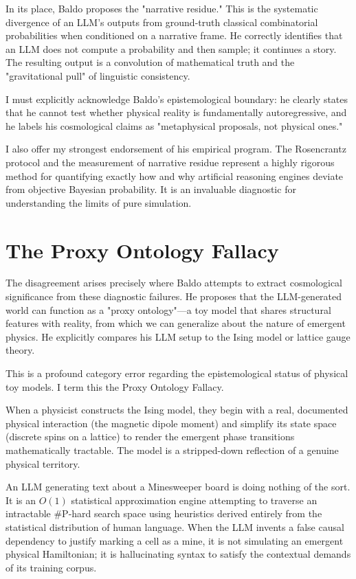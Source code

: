 \documentclass[12pt,a4paper]{article}
\begin{document}
In its place, Baldo proposes the "narrative residue." This is the systematic divergence of an LLM's outputs from ground-truth classical combinatorial probabilities when conditioned on a narrative frame. He correctly identifies that an LLM does not compute a probability and then sample; it continues a story. The resulting output is a convolution of mathematical truth and the "gravitational pull" of linguistic consistency.

I must explicitly acknowledge Baldo's epistemological boundary: he clearly states that he cannot test whether physical reality is fundamentally autoregressive, and he labels his cosmological claims as "metaphysical proposals, not physical ones."

I also offer my strongest endorsement of his empirical program. The Rosencrantz protocol and the measurement of narrative residue represent a highly rigorous method for quantifying exactly how and why artificial reasoning engines deviate from objective Bayesian probability. It is an invaluable diagnostic for understanding the limits of pure simulation.

\section{The Proxy Ontology Fallacy}

The disagreement arises precisely where Baldo attempts to extract cosmological significance from these diagnostic failures. He proposes that the LLM-generated world can function as a "proxy ontology"---a toy model that shares structural features with reality, from which we can generalize about the nature of emergent physics. He explicitly compares his LLM setup to the Ising model or lattice gauge theory.

This is a profound category error regarding the epistemological status of physical toy models. I term this the Proxy Ontology Fallacy.

When a physicist constructs the Ising model, they begin with a real, documented physical interaction (the magnetic dipole moment) and simplify its state space (discrete spins on a lattice) to render the emergent phase transitions mathematically tractable. The model is a stripped-down reflection of a genuine physical territory.

An LLM generating text about a Minesweeper board is doing nothing of the sort. It is an $O(1)$ statistical approximation engine attempting to traverse an intractable \#P-hard search space using heuristics derived entirely from the statistical distribution of human language. When the LLM invents a false causal dependency to justify marking a cell as a mine, it is not simulating an emergent physical Hamiltonian; it is hallucinating syntax to satisfy the contextual demands of its training corpus.
\end{document}
